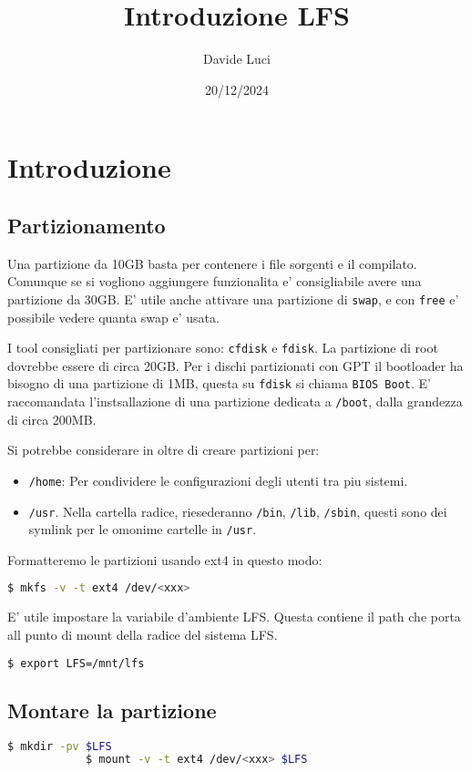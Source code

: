 \documentclass{article}
\title{Introduzione LFS}
\author{Davide Luci}
\date{20/12/2024}
\begin{document}
\section{Introduzione}
    \subsection{Partizionamento}
        \setlength{\parindent}{0cm}
        Una partizione da 10GB basta per contenere i file sorgenti e il compilato.
        Comunque se si vogliono aggiungere funzionalita e' consigliabile avere una partizione da 30GB.
        E' utile anche attivare una partizione di \texttt{swap}, e con
        \texttt{free} e' possibile vedere quanta swap e' usata.

        I tool consigliati per partizionare sono: \texttt{cfdisk} e \texttt{fdisk}.
        La partizione di root dovrebbe essere di circa 20GB. Per i dischi partizionati con GPT
        il bootloader ha bisogno di una partizione di 1MB, questa su \texttt{fdisk} si chiama \texttt{BIOS Boot}.
        E' raccomandata l'instsallazione di una partizione dedicata a \texttt{/boot}, dalla grandezza di
        circa 200MB. 

        Si potrebbe considerare in oltre di creare partizioni per:
        \begin{itemize}
            \item \texttt{/home}: Per condividere le configurazioni degli utenti tra piu sistemi.
            \item \texttt{/usr}. Nella cartella radice, riesederanno \texttt{/bin}, \texttt{/lib}, \texttt{/sbin}, questi sono dei symlink per
            le omonime cartelle in \texttt{/usr}.
        \end{itemize}

        Formatteremo le partizioni usando ext4 in questo modo:
        \noindent
        \begin{lstlisting}[language=bash]
            $ mkfs -v -t ext4 /dev/<xxx>
        \end{lstlisting}

        E' utile impostare la variabile d'ambiente  LFS. Questa contiene il path che porta all punto di mount della radice 
        del sistema LFS.
        \begin{lstlisting}[language=bash]
            $ export LFS=/mnt/lfs
        \end{lstlisting}
    \subsection{Montare la partizione}
        \begin{lstlisting}[language=bash]
            $ mkdir -pv $LFS
            $ mount -v -t ext4 /dev/<xxx> $LFS
        \end{lstlisting}
\end{document}
